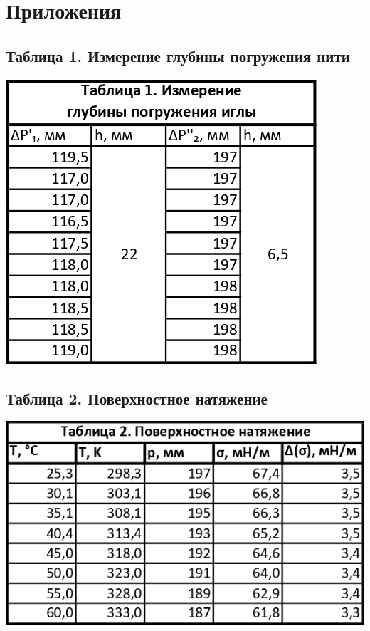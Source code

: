 \documentclass[15pt,a5paper,reqno]{article}
\begin{document}
\newpage
\section{Приложения}

    \subsection{Таблица 1. Измерение глубины погружения нити}
    \begin{center}
        \includegraphics{Таблица 1.jpg}
    \end{center}
    
    \subsection{Таблица 2. Поверхностное натяжение}
    \begin{center}
        \includegraphics{Таблица 2.jpg}
    \end{center}
    
\end{document}
